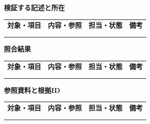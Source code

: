 \documentclass[11pt,a4paper]{article}
\begin{document}
\par{}\noindent\textbf{検証する記述と所在}\par\vspace{1mm}
{\fontsize{8.5}{13}\selectfont
\begin{tabularx}{\linewidth}{@{}XXXX@{}}
\textbf{対象・項目} & \textbf{内容・参照} & \textbf{担当・状態} & \textbf{備考}\\[2mm]
\strut & \strut & \strut & \strut\\[5mm]
\strut & \strut & \strut & \strut\\[5mm]
\end{tabularx}
}\vspace{2mm}\par
{}
\par{}\noindent\textbf{照合結果}\par\vspace{1mm}
{\fontsize{8.5}{13}\selectfont
\begin{tabularx}{\linewidth}{@{}XXXX@{}}
\textbf{対象・項目} & \textbf{内容・参照} & \textbf{担当・状態} & \textbf{備考}\\[2mm]
\strut & \strut & \strut & \strut\\[5mm]
\strut & \strut & \strut & \strut\\[5mm]
\end{tabularx}
}\vspace{2mm}\par
{}
\par{}\noindent\textbf{参照資料と根拠ID}\par\vspace{1mm}
{\fontsize{8.5}{13}\selectfont
\begin{tabularx}{\linewidth}{@{}XXXX@{}}
\textbf{対象・項目} & \textbf{内容・参照} & \textbf{担当・状態} & \textbf{備考}\\[2mm]
\strut & \strut & \strut & \strut\\[5mm]
\strut & \strut & \strut & \strut\\[5mm]
\end{tabularx}
}\vspace{2mm}\par
\end{document}
